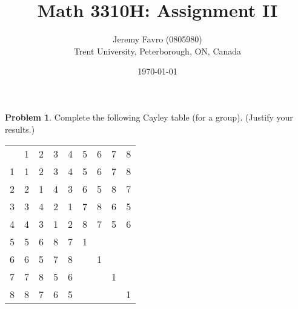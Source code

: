 \documentclass[10pt]{article}
\title{Math 3310H: Assignment II}
\author{Jeremy Favro (0805980) \\ Trent University, Peterborough, ON, Canada}
\date{\today}
\theoremstyle{definition}
\newtheorem{problem}{Problem}
\begin{document}
\maketitle

\begin{problem}
Complete the following Cayley table (for a group). (Justify your
results.)
\begin{center}
  \begin{tabular}{c | c c c c c c c c}
    ~ & 1 & 2 & 3 & 4 & 5 & 6 & 7 & 8 \\
    \cline{1-9}
    1 & 1 & 2 & 3 & 4 & 5 & 6 & 7 & 8 \\
    2 & 2 & 1 & 4 & 3 & 6 & 5 & 8 & 7 \\
    3 & 3 & 4 & 2 & 1 & 7 & 8 & 6 & 5 \\
    4 & 4 & 3 & 1 & 2 & 8 & 7 & 5 & 6 \\
    5 & 5 & 6 & 8 & 7 & 1 &   &   &   \\
    6 & 6 & 5 & 7 & 8 &   & 1 &   &   \\
    7 & 7 & 8 & 5 & 6 &   &   & 1 &   \\
    8 & 8 & 7 & 6 & 5 &   &   &   & 1
  \end{tabular}
\end{center}
\end{problem}
\end{document}
